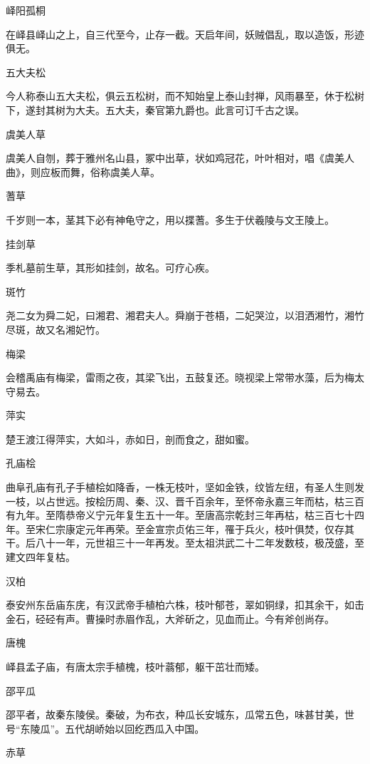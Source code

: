 \documentclass[a4paper,12pt,UTF8,twoside]{ctexbook}
\begin{document}
    峄阳孤桐
    
    在峄县峄山之上，自三代至今，止存一截。天启年间，妖贼倡乱，取以造饭，形迹俱无。
    
    五大夫松
    
    今人称泰山五大夫松，俱云五松树，而不知始皇上泰山封禅，风雨暴至，休于松树下，遂封其树为大夫。五大夫，秦官第九爵也。此言可订千古之误。
    
    虞美人草
    
    虞美人自刎，葬于雅州名山县，冢中出草，状如鸡冠花，叶叶相对，唱《虞美人曲》，则应板而舞，俗称虞美人草。
    
    蓍草
    
    千岁则一本，茎其下必有神龟守之，用以揲蓍。多生于伏羲陵与文王陵上。
    
    挂剑草
    
    季札墓前生草，其形如挂剑，故名。可疗心疾。
    
    斑竹
    
    尧二女为舜二妃，曰湘君、湘君夫人。舜崩于苍梧，二妃哭泣，以泪洒湘竹，湘竹尽斑，故又名湘妃竹。
    
    梅梁
    
    会稽禹庙有梅梁，雷雨之夜，其梁飞出，五鼓复还。晓视梁上常带水藻，后为梅太守易去。
    
    萍实
    
    楚王渡江得萍实，大如斗，赤如日，剖而食之，甜如蜜。
    
    孔庙桧
    
    曲阜孔庙有孔子手植桧如降香，一株无枝叶，坚如金铁，纹皆左纽，有圣人生则发一枝，以占世远。按桧历周、秦、汉、晋千百余年，至怀帝永嘉三年而枯，枯三百有九年。至隋恭帝义宁元年复生五十一年。至唐高宗乾封三年再枯，枯三百七十四年。至宋仁宗康定元年再荣。至金宣宗贞佑三年，罹于兵火，枝叶俱焚，仅存其干。后八十一年，元世祖三十一年再发。至太祖洪武二十二年发数枝，极茂盛，至建文四年复枯。
    
    汉柏
    
    泰安州东岳庙东庑，有汉武帝手植柏六株，枝叶郁苍，翠如铜绿，扣其余干，如击金石，硁硁有声。曹操时赤眉作乱，大斧斫之，见血而止。今有斧创尚存。
    
    唐槐
    
    峄县孟子庙，有唐太宗手植槐，枝叶蓊郁，躯干茁壮而矮。
    
    邵平瓜
    
    邵平者，故秦东陵侯。秦破，为布衣，种瓜长安城东，瓜常五色，味甚甘美，世号“东陵瓜”。五代胡峤始以回纥西瓜入中国。
    
    赤草
    
\end{document}

